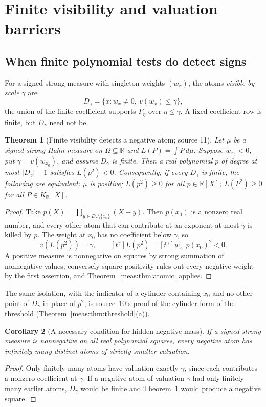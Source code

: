 \documentclass[11pt]{article}
\numberwithin{equation}{section}
\newtheorem{theorem}{Theorem}[section]
\newtheorem{corollary}[theorem]{Corollary}
\theoremstyle{definition}
\theoremstyle{remark}
\newcommand{\R}{\mathbb R}
\newcommand{\KR}{K_{\R}}
\newcommand{\coef}[2]{[t^{#1}]#2}
\newcommand{\abs}[1]{\lvert#1\rvert}
\begin{document}
\section{Finite visibility and valuation barriers}\label{meas:sec:visibility}

\subsection{When finite polynomial tests do detect signs}

For a signed strong measure with singleton weights $(w_x)$, the atoms
\emph{visible by scale} $\gamma$ are
\begin{equation}\label{meas:eq:visible}
 D_\gamma=\{x:w_x\ne0,\ v(w_x)\le\gamma\},
\end{equation}
the union of the finite coefficient supports $F_\eta$ over $\eta\le\gamma$. A
fixed coefficient row is finite, but $D_\gamma$ need not be.

\begin{theorem}[Finite visibility detects a negative atom; source 11]
\label{meas:thm:visibility}
Let $\mu$ be a signed strong Hahn measure on $\Omega\subseteq\R$ and
$L(P)=\int P\,d\mu$. Suppose $w_{x_0}<0$, put $\gamma=v(w_{x_0})$, and assume
$D_\gamma$ is finite. Then a real polynomial $p$ of degree at most
$\abs{D_\gamma}-1$ satisfies $L(p^2)<0$. Consequently, if every $D_\gamma$ is
finite, the following are equivalent: $\mu$ is positive; $L(p^2)\ge0$ for all
$p\in\R[X]$; $L(P^2)\ge0$ for all $P\in\KR[X]$.
\end{theorem}
\begin{proof}
Take $p(X)=\prod_{y\in D_\gamma\setminus\{x_0\}}(X-y)$. Then $p(x_0)$ is a nonzero
real number, and every other atom that can contribute at an exponent at most
$\gamma$ is killed by $p$. The weight at $x_0$ has no coefficient below $\gamma$,
so
\[
 v(L(p^2))=\gamma,\qquad \coef{\gamma}{L(p^2)}=\coef{\gamma}{w_{x_0}}\,p(x_0)^2<0.
\]
A positive measure is nonnegative on squares by strong summation of
nonnegative values; conversely square positivity rules out every negative
weight by the first assertion, and Theorem~\ref{meas:thm:atomic} applies.
\end{proof}

The same isolation, with the indicator of a cylinder containing $x_0$ and no
other point of $D_\gamma$ in place of $p^2$, is source~10's proof of the
cylinder form of the threshold (Theorem~\ref{meas:thm:threshold}(a)).

\begin{corollary}[A necessary condition for hidden negative mass]
\label{meas:cor:hidden-necessary}
If a signed strong measure is nonnegative on all real polynomial squares,
every negative atom has infinitely many distinct atoms of strictly smaller
valuation.
\end{corollary}
\begin{proof}
Only finitely many atoms have valuation exactly $\gamma$, since each contributes
a nonzero coefficient at $\gamma$. If a negative atom of valuation $\gamma$ had
only finitely many earlier atoms, $D_\gamma$ would be finite and
Theorem~\ref{meas:thm:visibility} would produce a negative square.
\end{proof}
\end{document}
